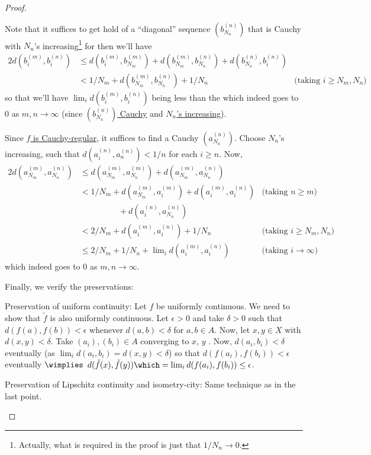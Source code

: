\begin{proof}
\begin{prooflist}
			Note that it suffices to get hold of a ``diagonal'' sequence $(b^{(n)}_{N_n})$ that is Cauchy with $N_n$'s increasing\footnote{
				Actually, what is required in the proof is just that $1/N_n\to 0$.
			} for then we'll have
			\begin{alignat*}{2}
				d(b^{(m)}_i, b^{(n)}_i)
				& \le d(b^{(m)}_i, b^{(m)}_{N_m}) + d(b^{(m)}_{N_m}, b^{(n)}_{N_n}) + d(b^{(n)}_{N_n}, b^{(n)}_i)\\
				& < 1/N_m + d(b^{(m)}_{N_m}, b^{(n)}_{N_n}) + 1/N_n & \text{(taking $i\ge N_m, N_n$)}
			\end{alignat*}
			so that we'll have $\lim_i d(b^{(m)}_i, b^{(n)}_i)$ being less than the \RHS which indeed goes to $0$ as $m, n\to \infty$ (since \uline{$(b^{(n)}_{N_n})$ Cauchy} and \uline{$N_n$'s increasing}).
			
			Since \uline{$f$ is Cauchy-regular}, it suffices to find a Cauchy $(a^{(n)}_{N_n})$. Choose $N_n$'s increasing, such that $d(a^{(n)}_i, a^{(n)}_n) < 1/n$ for each $i\ge n$. Now,
			\begin{alignat*}{2}
				d(a^{(m)}_{N_m}, a^{(n)}_{N_n})
				& \le d(a^{(m)}_{N_m}, a^{(m)}_{N_n}) + d(a^{(m)}_{N_m}, a^{(n)}_{N_n})\\
				& < 1/N_m + d(a^{(m)}_{N_m}, a^{(m)}_i) + d(a^{(m)}_i, a^{(n)}_i) & \text{(taking $n\ge m$)}\\
				& \phantom{{} < 1/N_m}\hspace{10pt} {} + d(a^{(n)}_i, a^{(n)}_{N_n})\\
				& < 2/N_m + d(a^{(m)}_i, a^{(n)}_i) + 1/N_n & \text{(taking $i\ge N_m, N_n$)}\\
				& \le 2/N_m + 1/N_n + \lim\nolimits_i d(a^{(m)}_i, a^{(n)}_i) & \text{(taking $i\to \infty$)}
			\end{alignat*}
			which indeed goes to $0$ as $m, n\to\infty$.
		\end{prooflist}
			
		Finally, we verify the preservations:
			\begin{prooflist}
				\item Preservation of uniform continuity:
				Let $f$ be uniformly continuous. We need to show that $\tilde f$ is also uniformly continuous. Let $\epsilon > 0$ and take $\delta > 0$ such that $d(f(a), f(b)) < \epsilon$ whenever $d(a, b) < \delta$ for $a, b\in A$. Now, let $x, y\in X$ with $d(x, y) < \delta$. Take $(a_i), (b_i)\in A$ converging to $x$, $y$ \resp. Now, $d(a_i, b_i) < \delta$ eventually (as $\lim_i d(a_i, b_i) = d(x, y) < \delta$) so that $d(f(a_i), f(b_i)) < \epsilon$ eventually $\wimplies$ $d(\tilde f(x), \tilde f(y)) \which= \lim_i d(f(a_i), f(b_i))\le \epsilon$.
				
				
				\item Preservation of Lipschitz continuity and isometry-city:
				Same technique as in the last point.
				\qedhere
			\end{prooflist}
	\end{proof}
	
